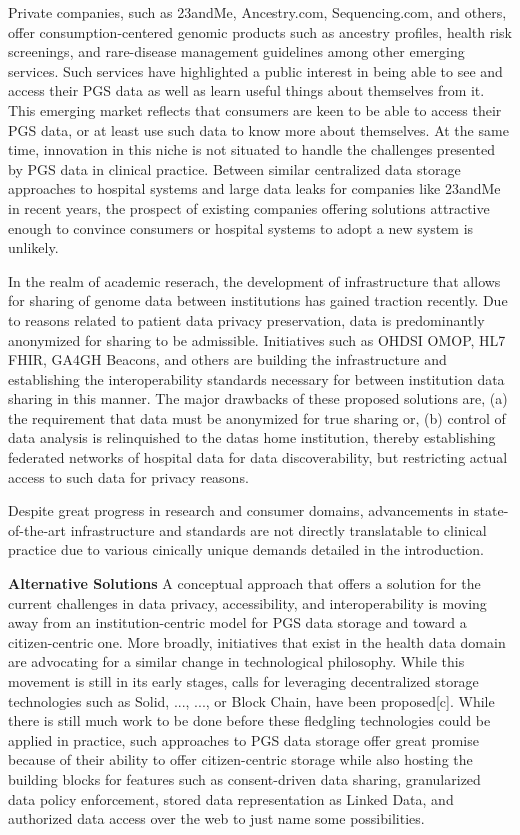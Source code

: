 \documentclass[runningheads]{llncs}
\begin{document}
Private companies, such as 23andMe, Ancestry.com, Sequencing.com, and others, offer consumption-centered genomic products such as ancestry profiles, health risk screenings, and rare-disease management guidelines among other emerging services. 
Such services have highlighted a public interest in being able to see and access their PGS data as well as learn useful things about themselves from it.
This emerging market reflects that consumers are keen to be able to access their PGS data, or at least use such data to know more about themselves. 
At the same time, innovation in this niche is not situated to handle the challenges presented by PGS data in clinical practice. 
Between similar centralized data storage approaches to hospital systems and large data leaks for companies like 23andMe in recent years, the prospect of existing companies offering solutions attractive enough to convince consumers or hospital systems to adopt a new system is unlikely. 

In the realm of academic reserach, the development of infrastructure that allows for sharing of genome data between institutions has gained traction recently. 
Due to reasons related to patient data privacy preservation, data is predominantly anonymized for sharing to be admissible. 
Initiatives such as OHDSI OMOP, HL7 FHIR, GA4GH Beacons, and others are building the infrastructure and establishing the interoperability standards necessary for between institution data sharing in this manner. 
The major drawbacks of these proposed solutions are, (a) the requirement that data must be anonymized for true sharing or, (b) control of data analysis is relinquished to the data\textquotesingle s home institution, thereby establishing federated networks of hospital data for data discoverability, but restricting actual access to such data for privacy reasons.

Despite great progress in research and consumer domains, advancements in state-of-the-art infrastructure and standards are not directly translatable to clinical practice due to various cinically unique demands detailed in the introduction. 


\textbf{Alternative Solutions}
A conceptual approach that offers a solution for the current challenges in data privacy, accessibility, and interoperability is moving away from an institution-centric model for PGS data storage and toward a citizen-centric one. More broadly, initiatives that exist in the health data domain are advocating for a similar change in technological philosophy. While this movement is still in its early stages, calls for leveraging decentralized storage technologies such as Solid, ..., ..., or Block Chain, have been proposed[c]. While there is still much work to be done before these fledgling technologies could be applied in practice, such approaches to PGS data storage offer great promise because of their ability to offer citizen-centric storage while also hosting the building blocks for features such as consent-driven data sharing, granularized data policy enforcement, stored data representation as Linked Data, and authorized data access over the web to just name some possibilities. 
\end{document}
